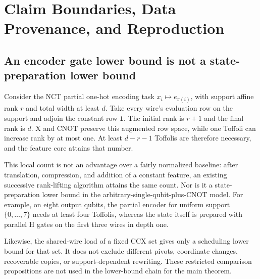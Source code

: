 \section{Claim Boundaries, Data Provenance, and Reproduction}\label{app:scope}
\subsection{An encoder gate lower bound is not a state-preparation lower bound}
Consider the NCT partial one-hot encoding task $x_i\mapsto e_{\pi(i)}$, with support affine rank $r$ and total width at least $d$. Take every wire's evaluation row on the support and adjoin the constant row $\mathbf1$. The initial rank is $r+1$ and the final rank is $d$. X and CNOT preserve this augmented row space, while one Toffoli can increase rank by at most one. At least $d-r-1$ Toffolis are therefore necessary, and the feature core attains that number.

This local count is not an advantage over a fairly normalized baseline: after translation, compression, and addition of a constant feature, an existing successive rank-lifting algorithm attains the same count\cite{vilmart2026}. Nor is it a state-preparation lower bound in the arbitrary-single-qubit-plus-CNOT model. For example, on eight output qubits, the partial encoder for uniform support $\{0,\ldots,7\}$ needs at least four Toffolis, whereas the state itself is prepared with parallel H gates on the first three wires in depth one.

Likewise, the shared-wire load of a fixed CCX set gives only a scheduling lower bound for that set. It does not exclude different pivots, coordinate changes, recoverable copies, or support-dependent rewriting. These restricted comparison propositions are not used in the lower-bound chain for the main theorem.

